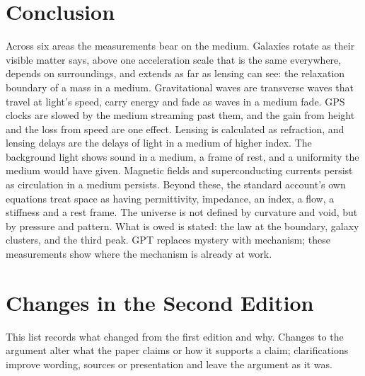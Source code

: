 \documentclass[11pt,a4paper]{article}
\begin{document}
\section*{Conclusion}

Across six areas the measurements bear on the medium. Galaxies rotate as their visible matter says, above one acceleration scale that is the same everywhere, depends on surroundings, and extends as far as lensing can see: the relaxation boundary of a mass in a medium. Gravitational waves are transverse waves that travel at light's speed, carry energy and fade as waves in a medium fade. GPS clocks are slowed by the medium streaming past them, and the gain from height and the loss from speed are one effect. Lensing is calculated as refraction, and lensing delays are the delays of light in a medium of higher index. The background light shows sound in a medium, a frame of rest, and a uniformity the medium would have given. Magnetic fields and superconducting currents persist as circulation in a medium persists. Beyond these, the standard account's own equations treat space as having permittivity, impedance, an index, a flow, a stiffness and a rest frame. The universe is not defined by curvature and void, but by pressure and pattern. What is owed is stated: the law at the boundary, galaxy clusters, and the third peak. GPT replaces mystery with mechanism; these measurements show where the mechanism is already at work.

\clearpage
\section*{Changes in the Second Edition}

This list records what changed from the first edition and why. Changes to the argument alter what the paper claims or how it supports a claim; clarifications improve wording, sources or presentation and leave the argument as it was.
\end{document}
